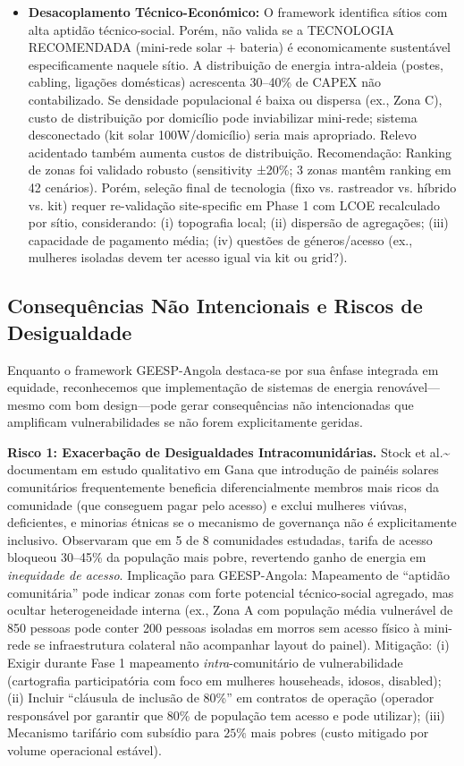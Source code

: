 \documentclass[12pt, a4paper]{article}
\begin{document}
\begin{itemize}
\item \textbf{Desacoplamento Técnico-Económico:} O framework identifica sítios com alta aptidão técnico-social. Porém, não valida se a TECNOLOGIA RECOMENDADA (mini-rede solar + bateria) é economicamente sustentável especificamente naquele sítio. A distribuição de energia intra-aldeia (postes, cabling, ligações domésticas) acrescenta 30--40\% de CAPEX não contabilizado. Se densidade populacional é baixa ou dispersa (ex., Zona C), custo de distribuição por domicílio pode inviabilizar mini-rede; sistema desconectado (kit solar 100W/domicílio) seria mais apropriado. Relevo acidentado também aumenta custos de distribuição. Recomendação: Ranking de zonas foi validado robusto (sensitivity ±20\%; 3 zonas mantêm ranking em 42 cenários). Porém, seleção final de tecnologia (fixo vs. rastreador vs. híbrido vs. kit) requer re-validação site-specific em Phase 1 com LCOE recalculado por sítio, considerando: (i) topografia local; (ii) dispersão de agregações; (iii) capacidade de pagamento média; (iv) questões de géneros/acesso (ex., mulheres isoladas devem ter acesso igual via kit ou grid?).

\end{itemize}

\subsection{Consequências Não Intencionais e Riscos de Desigualdade}

Enquanto o framework GEESP-Angola destaca-se por sua ênfase integrada em equidade, reconhecemos que implementação de sistemas de energia renovável—mesmo com bom design—pode gerar consequências não intencionadas que amplificam vulnerabilidades se não forem explicitamente geridas.

\textbf{Risco 1: Exacerbação de Desigualdades Intracomunidárias.} Stock et al.\textasciitilde{}\citep{Stock2023} documentam em estudo qualitativo em Gana que introdução de painéis solares comunitários frequentemente beneficia diferencialmente membros mais ricos da comunidade (que conseguem pagar pelo acesso) e exclui mulheres viúvas, deficientes, e minorias étnicas se o mecanismo de governança não é explicitamente inclusivo. Observaram que em 5 de 8 comunidades estudadas, tarifa de acesso bloqueou 30--45\% da população mais pobre, revertendo ganho de energia em \textit{inequidade de acesso}. Implicação para GEESP-Angola: Mapeamento de ``aptidão comunitária'' pode indicar zonas com forte potencial técnico-social agregado, mas ocultar heterogeneidade interna (ex., Zona A com população média vulnerável de 850 pessoas pode conter 200 pessoas isoladas em morros sem acesso físico à mini-rede se infraestrutura colateral não acompanhar layout do painel). Mitigação: (i) Exigir durante Fase 1 mapeamento \textit{intra}-comunitário de vulnerabilidade (cartografia participatória com foco em mulheres househeads, idosos, disabled); (ii) Incluir ``cláusula de inclusão de 80\%'' em contratos de operação (operador responsável por garantir que 80\% de população tem acesso e pode utilizar);  (iii) Mecanismo tarifário com subsídio para $25\%$ mais pobres (custo mitigado por volume operacional estável).
\end{document}
